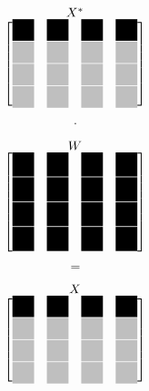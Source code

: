 \begin{center}
 
\begin{minipage}{0.2\textwidth}
 \begingroup
 \renewcommand*{\arraystretch}{1.1} %
 \renewcommand*{\arraycolsep}{0.0pt} %

 \[
  \stackrel{\mbox{$X^*$}}{
   \begin{bmatrix}
    \myBlackBox 	& \myBlackBox 		& \myBlackBox 		& \myBlackBox \\
    \myLightgrayBox 	& \myLightgrayBox 	& \myLightgrayBox 	& \myLightgrayBox \\
    \myLightgrayBox 	& \myLightgrayBox	& \myLightgrayBox	& \myLightgrayBox \\
    \myLightgrayBox 	& \myLightgrayBox 	& \myLightgrayBox 	& \myLightgrayBox 
   \end{bmatrix}
  }
 \]
 \endgroup
\end{minipage}
\begin{minipage}{0.05\textwidth}
 \[
  \cdot
 \]
\end{minipage}
\begin{minipage}{0.2\textwidth}
 \begingroup
 \renewcommand*{\arraystretch}{0.0} %
 \renewcommand*{\arraycolsep}{0.8pt} %

 \[
  \stackrel{\mbox{$W$}}{
   \begin{bmatrix}
    \myBlackBoxHigh 	& \myBlackBoxHigh 	& \myBlackBoxHigh 	& \myBlackBoxHigh \\
    \myBlackBoxHigh 	& \myBlackBoxHigh 	& \myBlackBoxHigh 	& \myBlackBoxHigh \\
    \myBlackBoxHigh 	& \myBlackBoxHigh 	& \myBlackBoxHigh 	& \myBlackBoxHigh \\
    \myBlackBoxHigh 	& \myBlackBoxHigh 	& \myBlackBoxHigh 	& \myBlackBoxHigh 
   \end{bmatrix}
  }
 \]
 \endgroup
\end{minipage}
\begin{minipage}{0.05\textwidth}
 \[
  =
 \]
\end{minipage}
\begin{minipage}{0.3\textwidth}
\begingroup
\renewcommand*{\arraystretch}{1.1} %
\renewcommand*{\arraycolsep}{0.8pt} %
\begin{align}\label{eq:matrix_F2}
  \stackrel{\mbox{$X$}}{
   \begin{bmatrix}
    \myBlackBox 	& \myBlackBox 		& \myBlackBox 		& \myBlackBox \\
    \myLightgrayBox 	& \myLightgrayBox 	& \myLightgrayBox 	& \myLightgrayBox \\
    \myLightgrayBox 	& \myLightgrayBox 	& \myLightgrayBox 	& \myLightgrayBox \\
    \myLightgrayBox 	& \myLightgrayBox 	& \myLightgrayBox 	& \myLightgrayBox 
   \end{bmatrix}
  }
 \end{align}
 \endgroup
\end{minipage}
\end{center}





